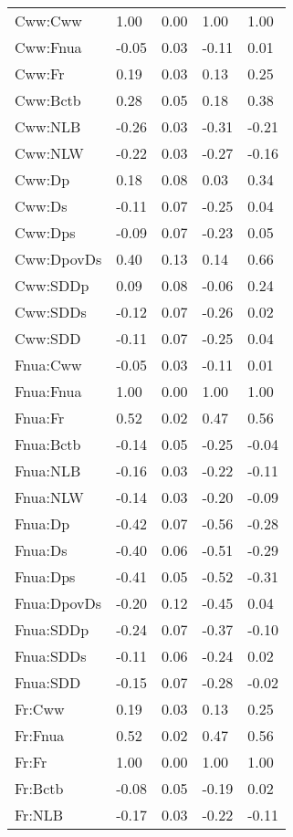 \begin{center}
\begin{longtable}{|p{0.9in}|p{0.7in}|p{0.7in}|p{0.7in}|p{0.7in}|}
Cww:Cww & 1.00 & 0.00 & 1.00 & 1.00 \\ 
  Cww:Fnua & -0.05 & 0.03 & -0.11 & 0.01 \\ 
  Cww:Fr & 0.19 & 0.03 & 0.13 & 0.25 \\ 
  Cww:Bctb & 0.28 & 0.05 & 0.18 & 0.38 \\ 
  Cww:NLB & -0.26 & 0.03 & -0.31 & -0.21 \\ 
  Cww:NLW & -0.22 & 0.03 & -0.27 & -0.16 \\ 
  Cww:Dp & 0.18 & 0.08 & 0.03 & 0.34 \\ 
  Cww:Ds & -0.11 & 0.07 & -0.25 & 0.04 \\ 
  Cww:Dps & -0.09 & 0.07 & -0.23 & 0.05 \\ 
  Cww:DpovDs & 0.40 & 0.13 & 0.14 & 0.66 \\ 
  Cww:SDDp & 0.09 & 0.08 & -0.06 & 0.24 \\ 
  Cww:SDDs & -0.12 & 0.07 & -0.26 & 0.02 \\ 
  Cww:SDD & -0.11 & 0.07 & -0.25 & 0.04 \\ 
  Fnua:Cww & -0.05 & 0.03 & -0.11 & 0.01 \\ 
  Fnua:Fnua & 1.00 & 0.00 & 1.00 & 1.00 \\ 
  Fnua:Fr & 0.52 & 0.02 & 0.47 & 0.56 \\ 
  Fnua:Bctb & -0.14 & 0.05 & -0.25 & -0.04 \\ 
  Fnua:NLB & -0.16 & 0.03 & -0.22 & -0.11 \\ 
  Fnua:NLW & -0.14 & 0.03 & -0.20 & -0.09 \\ 
  Fnua:Dp & -0.42 & 0.07 & -0.56 & -0.28 \\ 
  Fnua:Ds & -0.40 & 0.06 & -0.51 & -0.29 \\ 
  Fnua:Dps & -0.41 & 0.05 & -0.52 & -0.31 \\ 
  Fnua:DpovDs & -0.20 & 0.12 & -0.45 & 0.04 \\ 
  Fnua:SDDp & -0.24 & 0.07 & -0.37 & -0.10 \\ 
  Fnua:SDDs & -0.11 & 0.06 & -0.24 & 0.02 \\ 
  Fnua:SDD & -0.15 & 0.07 & -0.28 & -0.02 \\ 
  Fr:Cww & 0.19 & 0.03 & 0.13 & 0.25 \\ 
  Fr:Fnua & 0.52 & 0.02 & 0.47 & 0.56 \\ 
  Fr:Fr & 1.00 & 0.00 & 1.00 & 1.00 \\ 
  Fr:Bctb & -0.08 & 0.05 & -0.19 & 0.02 \\ 
  Fr:NLB & -0.17 & 0.03 & -0.22 & -0.11 \\ 

\end{longtable}
\end{center}
